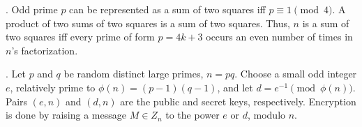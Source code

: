 .  Odd prime $p$ can be represented
as a sum of two squares iff $p \equiv 1 {\pmod 4}$.
A product of two sums of two squares is a sum of two squares.
Thus, $n$ is a sum of two squares iff every prime of
form $p=4k+3$ occurs an even number of times in $n$'s factorization.

. Let $p$ and $q$ be random distinct large primes, $n = pq$.
Choose a small odd integer $e$, relatively prime to $\phi(n) = (p-1)(q-1)$,
and let $d = e^{-1} \pmod{\phi(n)}$. Pairs $(e,n)$ and $(d,n)$ are
the public and secret keys, respectively.
Encryption is done by raising a message $M \in Z_n$ to the power $e$ or $d$,
modulo $n$.

